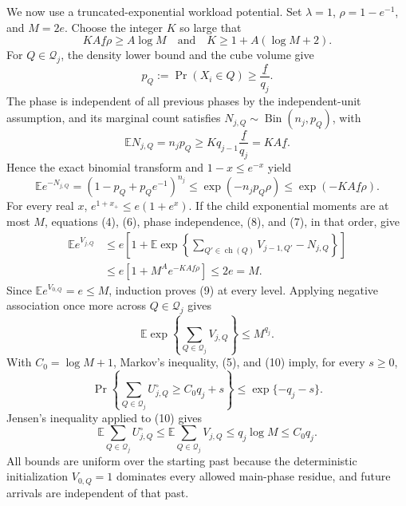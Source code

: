 We now use a truncated-exponential workload potential.  Set \(\lambda=1\), \(\rho=1-e^{-1}\), and \(M=2e\).  Choose the integer \(K\) so large that
\[
 KA\underline f\rho\ge A\log M
 \quad\text{and}\quad
 K\ge 1+A(\log M+2). \tag{7}
\]
For \(Q\in\mathcal Q_j\), the density lower bound and the cube volume give
\[
 p_Q:=\Pr(X_i\in Q)\ge \frac{\underline f}{q_j}.
\]
The phase is independent of all previous phases by the independent-unit assumption, and its marginal count satisfies \(N_{j,Q}\sim\operatorname{Bin}(n_j,p_Q)\), with
\[
 \mathbb E N_{j,Q}=n_jp_Q\ge Kq_{j-1}\frac{\underline f}{q_j}=KA\underline f.
\]
Hence the exact binomial transform and \(1-x\le e^{-x}\) yield
\[
 \mathbb E e^{-N_{j,Q}}
 =(1-p_Q+p_Qe^{-1})^{n_j}
 \le \exp(-n_jp_Q\rho)
 \le \exp(-KA\underline f\rho). \tag{8}
\]
For every real \(x\), \(e^{1+x_+}\le e(1+e^x)\).  If the child exponential moments are at most \(M\), equations (4), (6), phase independence, (8), and (7), in that order, give
\[
 \begin{aligned}
 \mathbb E e^{V_{j,Q}}
 &\le e\left[1+\mathbb E\exp\!\left\{\sum_{Q'\in\operatorname{ch}(Q)}V_{j-1,Q'}-N_{j,Q}\right\}\right]\\
 &\le e\left[1+M^A e^{-KA\underline f\rho}\right]
 \le 2e=M. \tag{9}
 \end{aligned}
\]
Since \(\mathbb Ee^{V_{0,Q}}=e\le M\), induction proves (9) at every level.  Applying negative association once more across \(Q\in\mathcal Q_j\) gives
\[
 \mathbb E\exp\!\left\{\sum_{Q\in\mathcal Q_j}V_{j,Q}\right\}
 \le M^{q_j}. \tag{10}
\]
With \(C_0=\log M+1\), Markov's inequality, (5), and (10) imply, for every \(s\ge0\),
\[
 \Pr\!\left\{\sum_{Q\in\mathcal Q_j}U^\circ_{j,Q}\ge C_0q_j+s\right\}
 \le \exp\{-q_j-s\}. \tag{11}
\]
Jensen's inequality applied to (10) gives
\[
 \mathbb E\sum_{Q\in\mathcal Q_j}U^\circ_{j,Q}
 \le \mathbb E\sum_{Q\in\mathcal Q_j}V_{j,Q}
 \le q_j\log M\le C_0q_j. \tag{12}
\]
All bounds are uniform over the starting past because the deterministic initialization \(V_{0,Q}=1\) dominates every allowed main-phase residue, and future arrivals are independent of that past.

